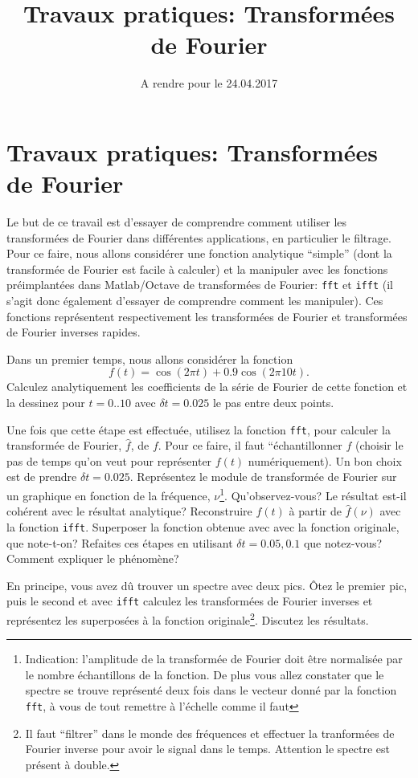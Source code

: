 \documentclass[a4paper,10pt]{article}
\title{Travaux pratiques: Transformées de Fourier}
\date{A rendre pour le 24.04.2017}
\newcommand{\hf}{\hat{f}}
\begin{document}
\maketitle

\section*{Travaux pratiques: Transformées de Fourier}

Le but de ce travail est d'essayer de comprendre comment utiliser les transformées de Fourier dans différentes applications,
en particulier le filtrage. Pour ce faire, nous allons considérer une fonction analytique ``simple'' (dont
la transformée de Fourier est facile à calculer) et la manipuler avec les fonctions préimplantées dans Matlab/Octave de
transformées de Fourier: \texttt{fft} et \texttt{ifft} (il s'agit donc également d'essayer de comprendre comment les manipuler). 
Ces fonctions représentent respectivement les transformées de Fourier et transformées de Fourier inverses rapides.

Dans un premier temps, nous allons considérer la fonction
\begin{equation}
 f(t)=\cos(2\pi t)+0.9\cos(2\pi 10 t).
\end{equation}
Calculez analytiquement les coefficients de la série de Fourier de cette fonction
et la dessinez pour $t=0..10$ avec $\delta t=0.025$ le pas entre deux points.

Une fois que cette étape est effectuée, utilisez la fonction \texttt{fft}, pour 
calculer la transformée de Fourier, $\hf$, de $f$. Pour ce faire,
il faut ``\'echantillonner $f$ (choisir le pas de temps qu'on veut pour représenter 
$f(t)$ numériquement). Un bon choix est de prendre $\delta t=0.025$.
Représentez le module de transformée de Fourier sur un graphique en fonction de la fréquence, $\nu$\footnote{Indication: l'amplitude de la transformée de Fourier doit être normalisée par le 
nombre échantillons de la fonction. De plus vous allez constater que le spectre se trouve représenté deux fois dans le vecteur donné par la fonction \texttt{fft}, à vous de tout remettre à l'échelle comme il faut}.
Qu'observez-vous? Le résultat est-il cohérent avec le résultat analytique? 
Reconstruire $f(t)$ à partir de $\hf(\nu)$ avec la fonction \texttt{ifft}. Superposer la fonction obtenue avec avec la fonction originale, que note-t-on?
Refaites ces étapes en utilisant $\delta t=0.05,0.1$ que notez-vous? Comment expliquer le phénomène?

En principe, vous avez dû trouver un spectre avec deux pics. Ôtez le premier 
pic, puis le second et avec \texttt{ifft} 
calculez les transformées de Fourier inverses et représentez les superposées à la fonction originale\footnote{Il faut ``filtrer'' dans le monde des fréquences et effectuer la tranformées de Fourier inverse pour avoir 
le signal dans le temps. Attention le spectre est présent à double.}. Discutez les résultats.
\end{document}
